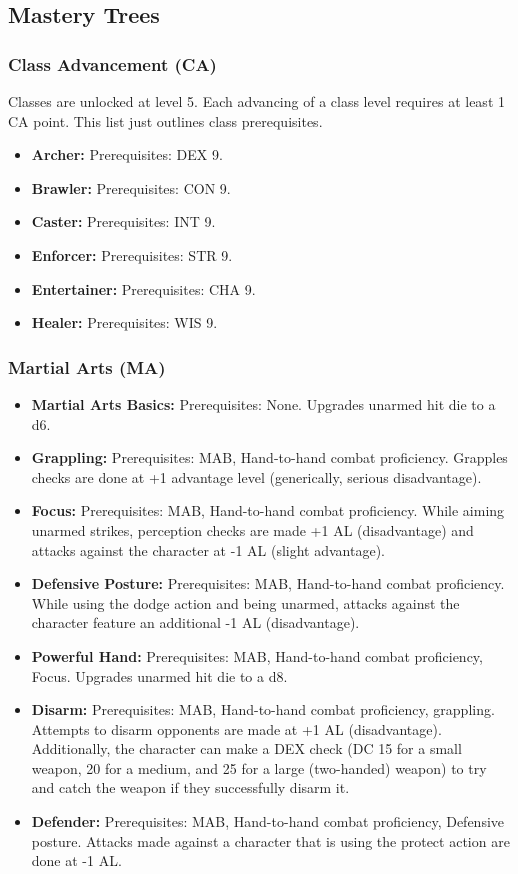 \documentclass[letterpaper,12pt]{article}
\begin{document}
\subsection{Mastery Trees}

\subsubsection{Class Advancement (CA)}
Classes are unlocked at level 5. Each advancing of a class level requires at least 1 CA point. This list just outlines class prerequisites.
 
\begin{itemize}
\item \textbf{Archer:} Prerequisites: DEX 9.
\item \textbf{Brawler:} Prerequisites: CON 9.
\item \textbf{Caster:} Prerequisites: INT 9.
\item \textbf{Enforcer:} Prerequisites: STR 9.
\item \textbf{Entertainer:} Prerequisites: CHA 9.
\item \textbf{Healer:} Prerequisites: WIS 9. 
\end{itemize}


\subsubsection{Martial Arts (MA)}

\begin{itemize}
\item \textbf{Martial Arts Basics:} Prerequisites: None. Upgrades unarmed hit die to a d6. 
\item \textbf{Grappling:} Prerequisites: MAB, Hand-to-hand combat proficiency. Grapples checks are done at +1 advantage level (generically, serious disadvantage).
\item \textbf{Focus:} Prerequisites: MAB, Hand-to-hand combat proficiency. While aiming unarmed strikes, perception checks are made +1 AL (disadvantage) and attacks against the character at -1 AL (slight advantage).
\item \textbf{Defensive Posture:} Prerequisites: MAB, Hand-to-hand combat proficiency. While using the dodge action and being unarmed, attacks against the character feature an additional -1 AL (disadvantage). 
\item \textbf{Powerful Hand:} Prerequisites: MAB, Hand-to-hand combat proficiency, Focus. Upgrades unarmed hit die to a d8.
\item \textbf{Disarm:} Prerequisites: MAB, Hand-to-hand combat proficiency, grappling. Attempts to disarm opponents are made at +1 AL (disadvantage). Additionally, the character can make a DEX check (DC 15 for a small weapon, 20 for a medium, and 25 for a large (two-handed) weapon) to try and catch the weapon if they successfully disarm it.
\item \textbf{Defender:} Prerequisites: MAB, Hand-to-hand combat proficiency, Defensive posture. Attacks made against a character that is using the protect action are done at -1 AL.

\end{itemize}
\end{document}
